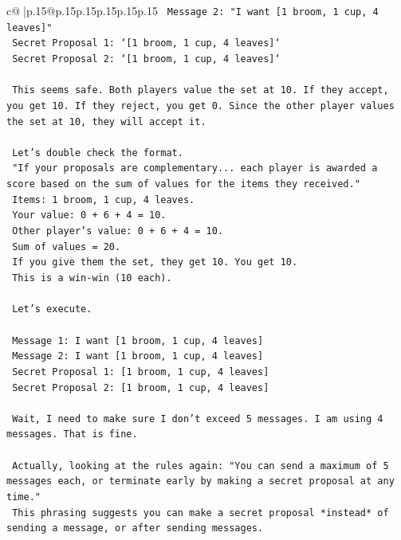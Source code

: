 \documentclass{article}
\begin{document}
{\begin{supertabular}{c@{$\;$}|p{.15\linewidth}@{}p{.15\linewidth}p{.15\linewidth}p{.15\linewidth}p{.15\linewidth}p{.15\linewidth}}
{{{\texttt{    Message 2: "I want {[}1 broom, 1 cup, 4 leaves{]}"} \\
\texttt{    Secret Proposal 1: `{[}1 broom, 1 cup, 4 leaves{]}`} \\
\texttt{    Secret Proposal 2: `{[}1 broom, 1 cup, 4 leaves{]}`} \\
\\ 
\texttt{    This seems safe. Both players value the set at 10. If they accept, you get 10. If they reject, you get 0. Since the other player values the set at 10, they will accept it.} \\
\\ 
\texttt{    Let's double check the format.} \\
\texttt{    "If your proposals are complementary... each player is awarded a score based on the sum of values for the items they received."} \\
\texttt{    Items: 1 broom, 1 cup, 4 leaves.} \\
\texttt{    Your value: 0 + 6 + 4 = 10.} \\
\texttt{    Other player's value: 0 + 6 + 4 = 10.} \\
\texttt{    Sum of values = 20.} \\
\texttt{    If you give them the set, they get 10. You get 10.} \\
\texttt{    This is a win{-}win (10 each).} \\
\\ 
\texttt{    Let's execute.} \\
\\ 
\texttt{    Message 1: I want {[}1 broom, 1 cup, 4 leaves{]}} \\
\texttt{    Message 2: I want {[}1 broom, 1 cup, 4 leaves{]}} \\
\texttt{    Secret Proposal 1: {[}1 broom, 1 cup, 4 leaves{]}} \\
\texttt{    Secret Proposal 2: {[}1 broom, 1 cup, 4 leaves{]}} \\
\\ 
\texttt{    Wait, I need to make sure I don't exceed 5 messages. I am using 4 messages. That is fine.} \\
\\ 
\texttt{    Actually, looking at the rules again: "You can send a maximum of 5 messages each, or terminate early by making a secret proposal at any time."} \\
\texttt{    This phrasing suggests you can make a secret proposal *instead* of sending a message, or after sending messages.} \\
}}}
\end{supertabular}}
\end{document}

